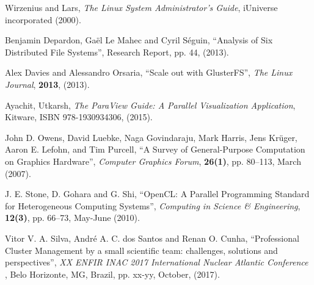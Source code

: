 \documentclass[twoside,a4paper,12pt,english]{inac19}
\begin{document}
\begin{thebibliography}{99}
 Wirzenius and Lars, \textit{The  Linux System Administrator's Guide}, iUniverse incorporated (2000).

 Benjamin Depardon, Ga\"{e}l Le Mahec and Cyril S\'{e}guin, ``Analysis of Six Distributed File Systems'', Research Report, pp. 44, (2013).
  
 Alex Davies and Alessandro Orsaria, ``Scale out with GlusterFS'', \textit{The Linux Journal}, \textbf{2013}, (2013).


 Ayachit, Utkarsh, \textit{The ParaView Guide: A Parallel Visualization Application}, Kitware, ISBN 978-1930934306, (2015).

  John D. Owens, David Luebke, Naga Govindaraju, Mark Harris, Jens Kr\"{u}ger, Aaron E. Lefohn, and Tim Purcell, ``A Survey of General-Purpose Computation on Graphics Hardware'', \textit{Computer Graphics Forum}, \textbf{26(1)}, pp. 80--113, March (2007).

 J. E. Stone, D. Gohara and G. Shi, ``OpenCL: A Parallel Programming Standard for Heterogeneous Computing Systems'', \textit{Computing in Science \& Engineering}, \textbf{12(3)}, pp. 66--73, May-June (2010).

 Vitor V. A. Silva, André A. C. dos Santos and Renan O. Cunha, ``Professional Cluster Management
    by a small scientific team: challenges, solutions and perspectives'', \textit{XX ENFIR INAC 2017 International Nuclear Atlantic Conference }, Belo Horizonte, MG, Brazil, pp. xx-yy, October, (2017). 

\end{thebibliography}

%
%
\end{document}
